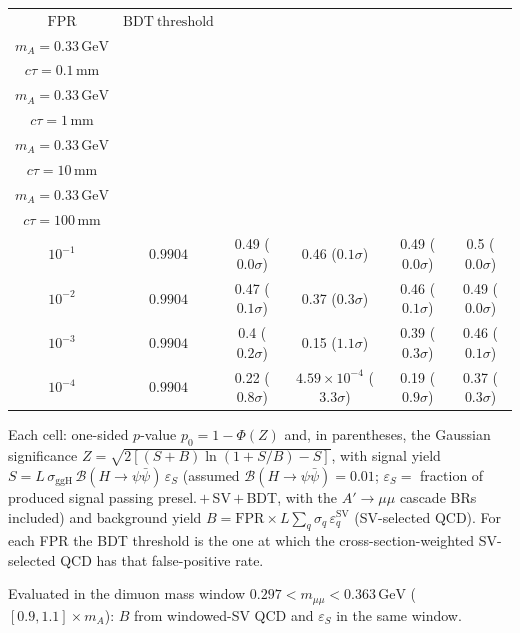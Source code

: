 \documentclass[10pt,a4paper]{article}
\begin{document}
{\begin{tabular}{cccccc}
\toprule
$\mathrm{FPR}$ & $\mathrm{BDT\ threshold}$ & \shortstack{$m_{\pi}=1\,\mathrm{GeV}$\\$m_{A}=0.33\,\mathrm{GeV}$\\$c\tau=0.1\,\mathrm{mm}$} & \shortstack{$m_{\pi}=1\,\mathrm{GeV}$\\$m_{A}=0.33\,\mathrm{GeV}$\\$c\tau=1\,\mathrm{mm}$} & \shortstack{$m_{\pi}=1\,\mathrm{GeV}$\\$m_{A}=0.33\,\mathrm{GeV}$\\$c\tau=10\,\mathrm{mm}$} & \shortstack{$m_{\pi}=1\,\mathrm{GeV}$\\$m_{A}=0.33\,\mathrm{GeV}$\\$c\tau=100\,\mathrm{mm}$} \\
\midrule
$10^{-1}$ & $0.9904$ & 0.49 ($0.0\sigma$) & 0.46 ($0.1\sigma$) & 0.49 ($0.0\sigma$) & 0.5 ($0.0\sigma$)\\
$10^{-2}$ & $0.9904$ & 0.47 ($0.1\sigma$) & 0.37 ($0.3\sigma$) & 0.46 ($0.1\sigma$) & 0.49 ($0.0\sigma$)\\
$10^{-3}$ & $0.9904$ & 0.4 ($0.2\sigma$) & 0.15 ($1.1\sigma$) & 0.39 ($0.3\sigma$) & 0.46 ($0.1\sigma$)\\
$10^{-4}$ & $0.9904$ & 0.22 ($0.8\sigma$) & $4.59\times10^{-4}$ ($3.3\sigma$) & 0.19 ($0.9\sigma$) & 0.37 ($0.3\sigma$)\\
\bottomrule
\end{tabular}

{\small Each cell: one-sided $p$-value $p_0=1-\Phi(Z)$ and, in parentheses, the Gaussian significance $Z=\sqrt{2\left[(S{+}B)\ln(1{+}S/B)-S\right]}$, with signal yield $S=L\,\sigma_{\mathrm{ggH}}\,\mathcal{B}(H\to\psi\bar{\psi})\,\varepsilon_S$ (assumed $\mathcal{B}(H\to\psi\bar{\psi})=0.01$; $\varepsilon_S=$ fraction of produced signal passing presel.\,$+$\,SV\,$+$\,BDT, with the $A'\to\mu\mu$ cascade BRs included) and background yield $B=\mathrm{FPR}\times L\sum_q\sigma_q\,\varepsilon_q^{\mathrm{SV}}$ (SV-selected QCD). For each FPR the BDT threshold is the one at which the cross-section-weighted SV-selected QCD has that false-positive rate.}

{\small Evaluated in the dimuon mass window $0.297<m_{\mu\mu}<0.363\,\mathrm{GeV}$ ($[0.9,1.1]\times m_A$): $B$ from windowed-SV QCD and $\varepsilon_S$ in the same window.}

}\clearpage
\end{document}
